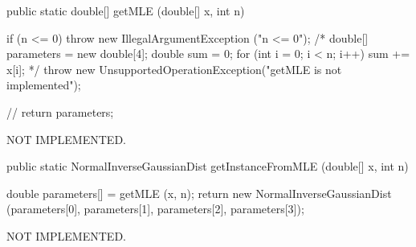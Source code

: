 \begin{code}

   public static double[] getMLE (double[] x, int n)\begin{hide} {
      if (n <= 0)
         throw new IllegalArgumentException ("n <= 0");
/*
      double[] parameters = new double[4];
      double sum = 0;
      for (int i = 0; i < n; i++) {
         sum += x[i];
      }
      */
      throw new UnsupportedOperationException("getMLE is not implemented");

  //    return parameters;
   }\end{hide}
\end{code}
\begin{tabb}
    NOT IMPLEMENTED.
\end{tabb}
\begin{htmlonly}
\end{htmlonly}
\begin{code}

   public static NormalInverseGaussianDist getInstanceFromMLE (double[] x,
                                                               int n)\begin{hide} {
      double parameters[] = getMLE (x, n);
      return new NormalInverseGaussianDist (parameters[0], parameters[1],
                                            parameters[2], parameters[3]);
   }\end{hide}
\end{code}
\begin{tabb}
    NOT IMPLEMENTED.
\end{tabb}
